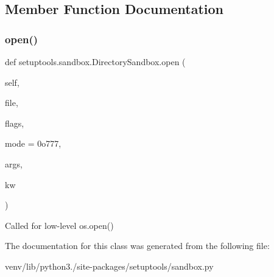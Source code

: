 \subsection{Member Function Documentation}
\mbox{\label{classsetuptools_1_1sandbox_1_1_directory_sandbox_aea079a4915b61a59a9e5fbf5b12053f2}} 
\subsubsection{\texorpdfstring{open()}{open()}}
{\footnotesize\ttfamily def setuptools.\+sandbox.\+Directory\+Sandbox.\+open (\begin{DoxyParamCaption}\item[{}]{self,  }\item[{}]{file,  }\item[{}]{flags,  }\item[{}]{mode = {\ttfamily 0o777},  }\item[{}]{args,  }\item[{}]{kw }\end{DoxyParamCaption})}

\begin{DoxyVerb}Called for low-level os.open()\end{DoxyVerb}
 

The documentation for this class was generated from the following file\+:\begin{DoxyCompactItemize}
\item 
venv/lib/python3./site-\/packages/setuptools/sandbox.\+py\end{DoxyCompactItemize}

